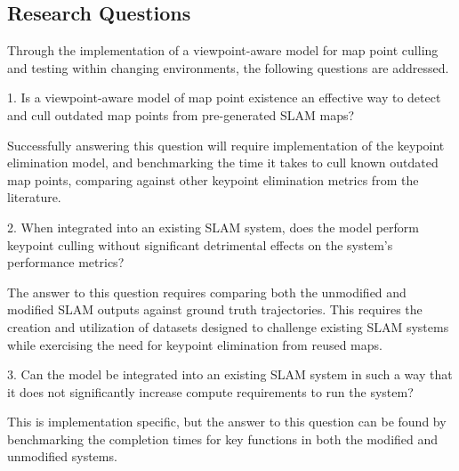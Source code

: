 \subsection{Research Questions}

Through the implementation of a viewpoint-aware model for map point culling and testing within changing environments, the following questions are addressed.


1. Is a viewpoint-aware model of map point existence an effective way to detect and cull outdated map points from pre-generated SLAM maps?

Successfully answering this question will require implementation of the keypoint elimination model, and benchmarking the time it takes to cull known outdated map points, comparing against other keypoint elimination metrics from the literature.


2. When integrated into an existing SLAM system, does the model perform keypoint culling without significant detrimental effects on the system's performance metrics?

The answer to this question requires comparing both the unmodified and modified SLAM outputs against ground truth trajectories. This requires the creation and utilization of datasets designed to challenge existing SLAM systems while exercising the need for keypoint elimination from reused maps.


3. Can the model be integrated into an existing SLAM system in such a way that it does not significantly increase compute requirements to run the system?

This is implementation specific, but the answer to this question can be found by benchmarking the completion times for key functions in both the modified and unmodified systems.